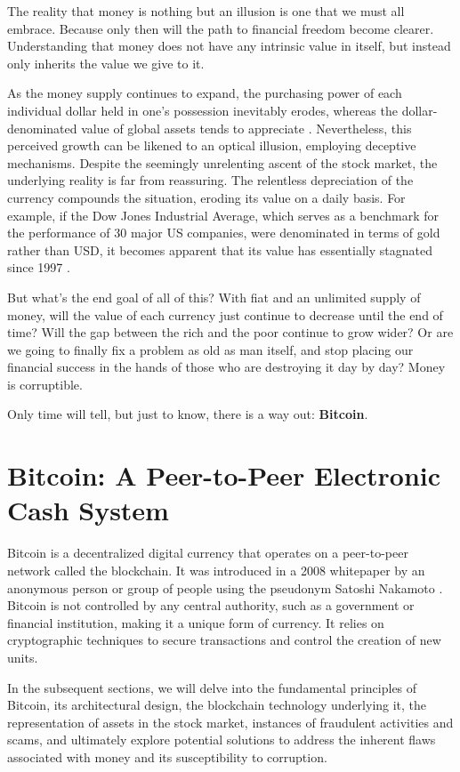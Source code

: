 The reality that money is nothing but an illusion is one that we must all embrace. Because only then will the path to financial freedom become
clearer. Understanding that money does not have any intrinsic value in itself, but instead only inherits the value we give to it.

As the money supply continues to expand, the purchasing power of each individual dollar held in one's possession inevitably erodes, whereas the dollar-denominated value of global assets tends to appreciate \cite{moneyprinting}. Nevertheless, this perceived growth can be likened to an optical illusion, employing deceptive mechanisms. Despite the seemingly unrelenting ascent of the stock market, the underlying reality is far from reassuring. The relentless depreciation of the currency compounds the situation, eroding its value on a daily basis. For example, if the Dow Jones Industrial Average, which serves as a benchmark for the performance of 30 major US companies, were denominated in terms of gold rather than USD, it becomes apparent that its value has essentially stagnated since 1997 \cite{stockmarketillusion}.

But what's the end goal of all of this? With fiat and an unlimited supply of money, will the value of each currency just continue to decrease until
the end of time? Will the gap between the rich and the poor continue to grow wider? Or are we going to finally fix a problem as old as man itself, and
stop placing our financial success in the hands of those who are destroying it day by day? Money is corruptible.

Only time will tell, but just to know, there is a way out: \textbf{Bitcoin}.

\section{Bitcoin: A Peer-to-Peer Electronic Cash System}
Bitcoin is a decentralized digital currency that operates on a peer-to-peer network called the blockchain. It was introduced in a 2008 whitepaper by an anonymous person or group of people using the pseudonym Satoshi Nakamoto \cite{nakamoto2008bitcoin}. Bitcoin is not controlled by any central authority, such as a government or financial institution, making it a unique form of currency. It relies on cryptographic techniques to secure transactions and control the creation of new units.

In the subsequent sections, we will delve into the fundamental principles of Bitcoin, its architectural design, the blockchain technology underlying it, the representation of assets in the stock market, instances of fraudulent activities and scams, and ultimately explore potential solutions to address the inherent flaws associated with money and its susceptibility to corruption.

